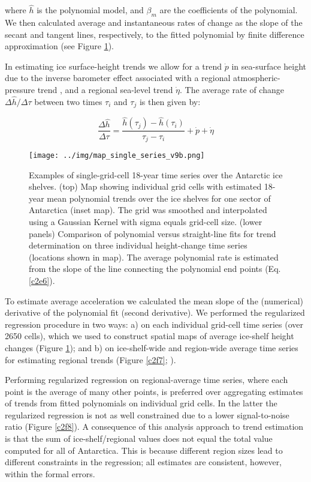 \noindent
where $\hat h$ is the polynomial model, and $\beta_m$ are the coefficients of the polynomial. We then calculated average and instantaneous rates of change as the slope of the secant and tangent lines, respectively, to the fitted polynomial by finite difference approximation (see Figure \ref{c2f6}). 

In estimating ice surface-height trends we allow for a trend $\dot p$ in sea-surface height due to the inverse barometer effect associated with a regional atmospheric-pressure trend \parencite{Padman2003}, and a regional sea-level trend $\dot \eta$. The average rate of change $\Delta \hat h/\Delta \tau$ between two times $\tau_i$ and $\tau_j$ is then given by:

\begin{equation}
  \frac{\Delta \hat h}{\Delta \tau} = 
    \frac{\hat h(\tau_j) - \hat h(\tau_i)}{\tau_j - \tau_i}
    + \dot p + \dot \eta
  \label{c2e6}
\end{equation}


\begin{figure}[!ht]
  \texttt{[image: ../img/map\_single\_series\_v9b.png]}
  \caption{
  Examples of single-grid-cell 18-year time series over the Antarctic ice shelves. (top) Map showing individual grid cells with estimated 18-year mean polynomial trends over the ice shelves for one sector of Antarctica (inset map). The grid was smoothed and interpolated using a Gaussian Kernel with sigma equals grid-cell size.  (lower panels) Comparison of polynomial versus straight-line fits for trend determination on three individual height-change time series (locations shown in map). The average polynomial rate is estimated from the slope of the line connecting the polynomial end points (Eq. \ref{c2e6}).
  } 
  \label{c2f6}
\end{figure}


To estimate average acceleration we calculated the mean slope of the (numerical) derivative of the polynomial fit (second derivative). We performed the regularized regression procedure in two ways: a) on each individual grid-cell time series (over 2650 cells), which we used to construct spatial maps of average ice-shelf height changes (Figure \ref{c2f6}); and b) on ice-shelf-wide and region-wide average time series for estimating regional trends (Figure \ref{c2f7}; \parencite{Paolo2015}). 

Performing regularized regression on regional-average time series, where each point is the average of many other points, is preferred over aggregating estimates of trends from fitted polynomials on individual grid cells. In the latter the regularized regression is not as well constrained due to a lower signal-to-noise ratio (Figure \ref{c2f8}). A consequence of this analysis approach to trend estimation is that the sum of ice-shelf/regional values does not equal the total value computed for all of Antarctica. This is because different region sizes lead to different constraints in the regression; all estimates are consistent, however, within the formal errors.


